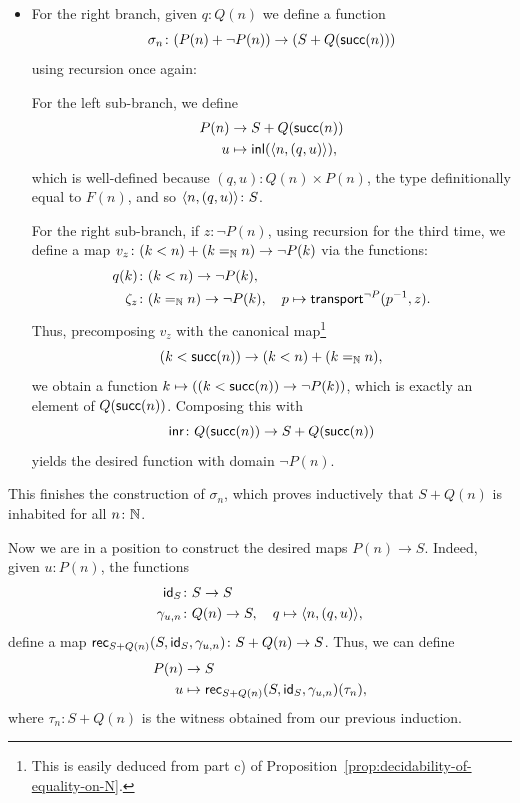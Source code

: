 \begin{solution}
\begin{itemize}
        \item For the right branch, given $q\colon Q(n)$ we define a function
        \[
            \sigma_n\colon(P(n)+\neg P(n))\to(S+Q(\fun{succ}(n)))
        \]
        using recursion once again:
        
        For the left sub-branch, we define
        \begin{align*}
            P(n)&\to S+Q(\mathsf{succ}(n))\\
            u&\mapsto\mathsf{inl}(\langle n,(q,u)\rangle),
        \end{align*}
        which is well-defined because $(q,u)\colon Q(n)\times P(n)$, the type definitionally equal to $F(n)$, and so $\dep{n,(q,u)}\colon S$.

        For the right sub-branch, if $z\colon\neg P(n)$, using recursion for the third time, we define a map $v_z\colon(k<n)+(k\eq\N n)\to\neg P(k)$ via the functions:
        \begin{align*}
            q(k)&\colon(k<n)\to\neg P(k),\\
            \zeta_z&\colon(k\eq\N n)\to\neg P(k),\quad p\mapsto\fun{transport}^{\neg P}(p^{-1},z).
        \end{align*}
        Thus, precomposing $v_z$ with the canonical map\footnote{This is easily deduced from part c) of Proposition~\ref{prop:decidability-of-equality-on-N}.}
        \[
            (k<\mathsf{succ}(n))\to(k<n)+(k\mathrel{=_{\mathbb{N}}} n),
        \]
        we obtain a function $k\mapsto((k<\mathsf{succ}(n))\to\neg P(k))$, which is exactly an element of $Q(\mathsf{succ}(n))$. Composing this with 
        \[
            \fun{inr}\colon Q(\fun{succ}(n))\to S+Q(\fun{succ}(n))
        \]
        yields the desired function with domain $\neg P(n)$.        
    \end{itemize}

    This finishes the construction of $\sigma_n$, which proves inductively that $S+Q(n)$ is inhabited for all $n\colon\N$.

    Now we are in a position to construct the desired maps $P(n)\to S$. Indeed, given $u\colon P(n)$, the functions
    \begin{align*}
        \id_S&\colon S\to S\\
        \gamma_{u,n}&\colon Q(n)\to S,\quad
        q\mapsto\dep{n,(q,u)},
    \end{align*}
    define a map $\fun{rec}_{S+Q(n)}(S,\id_S,\gamma_{u,n})\colon S+Q(n)\to S$. Thus, we can define
    \begin{align*}
        P(n)&\to S\\
        u&\mapsto\mathsf{rec}_{S+Q(n)}(S,\mathsf{id}_S,\gamma_{u,n})(\tau_n),
    \end{align*}
    where $\tau_n\colon S+Q(n)$ is the witness obtained from our previous induction.
    
\end{solution}


